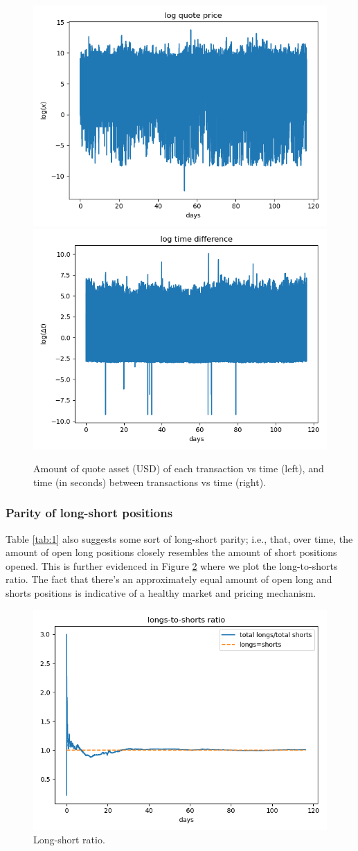 \documentclass[]{scrartcl}
\begin{document}
	\begin{figure}
		\centering
		\includegraphics[width=0.47\linewidth]{figures/dxvst}
		\includegraphics[width=0.47\linewidth]{figures/dtvst}
		
		\caption{Amount of quote asset (USD) of each transaction vs time (left), and time (in seconds) between transactions vs time (right). }
		\label{fig:trace}
	\end{figure}
	
	
	
	\subsubsection*{Parity of long-short positions} Table \ref{tab:1} also suggests some sort of long-short parity; i.e., that, over time, the amount of open long positions closely resembles the amount of short positions opened. This is further evidenced in Figure \ref{fig:lts} where we plot the long-to-shorts ratio.  The fact that there's an approximately equal amount of open long and shorts positions is indicative of a healthy market and pricing mechanism.
	
	
	
	
	\begin{figure}
		\centering
		\includegraphics[width=0.47\linewidth]{figures/lts}
		\caption{Long-short ratio.}
		\label{fig:lts}
	\end{figure}
	
\end{document}
